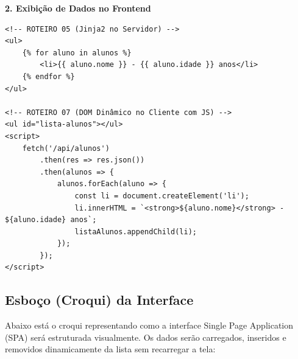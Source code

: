 \documentclass[12pt,a4paper]{article}
\begin{document}
\textbf{2. Exibição de Dados no Frontend}
\begin{boxCodigo}
\begin{verbatim}
<!-- ROTEIRO 05 (Jinja2 no Servidor) -->
<ul>
    {% for aluno in alunos %}
        <li>{{ aluno.nome }} - {{ aluno.idade }} anos</li>
    {% endfor %}
</ul>

<!-- ROTEIRO 07 (DOM Dinâmico no Cliente com JS) -->
<ul id="lista-alunos"></ul>
<script>
    fetch('/api/alunos')
        .then(res => res.json())
        .then(alunos => {
            alunos.forEach(aluno => {
                const li = document.createElement('li');
                li.innerHTML = `<strong>${aluno.nome}</strong> - ${aluno.idade} anos`;
                listaAlunos.appendChild(li);
            });
        });
</script>
\end{verbatim}
\end{boxCodigo}

\newpage

\subsection*{Esboço (Croqui) da Interface}

Abaixo está o croqui representando como a interface Single Page Application (SPA) será estruturada visualmente. Os dados serão carregados, inseridos e removidos dinamicamente da lista sem recarregar a tela:
\end{document}

